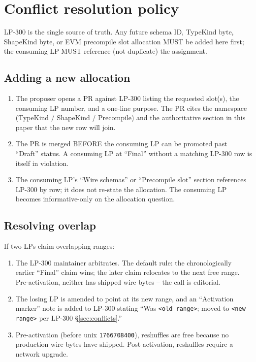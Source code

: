 \section{Conflict resolution policy}
\label{sec:policy}

LP-300 is the single source of truth. Any future schema ID, TypeKind
byte, ShapeKind byte, or EVM precompile slot allocation MUST be added
here first; the consuming LP MUST reference (not duplicate) the
assignment.

\subsection{Adding a new allocation}

\begin{enumerate}[leftmargin=2em,nosep]
\item The proposer opens a PR against LP-300 listing the requested
  slot(s), the consuming LP number, and a one-line purpose. The PR
  cites the namespace (TypeKind / ShapeKind / Precompile) and the
  authoritative section in this paper that the new row will join.
\item The PR is merged BEFORE the consuming LP can be promoted past
  ``Draft'' status. A consuming LP at ``Final'' without a matching
  LP-300 row is itself in violation.
\item The consuming LP's ``Wire schemas'' or ``Precompile slot''
  section references LP-300 by row; it does not re-state the
  allocation. The consuming LP becomes informative-only on the
  allocation question.
\end{enumerate}

\subsection{Resolving overlap}

If two LPs claim overlapping ranges:

\begin{enumerate}[leftmargin=2em,nosep]
\item The LP-300 maintainer arbitrates. The default rule: the
  chronologically earlier ``Final'' claim wins; the later claim
  relocates to the next free range. Pre-activation, neither has
  shipped wire bytes -- the call is editorial.
\item The losing LP is amended to point at its new range, and an
  ``Activation marker'' note is added to LP-300 stating ``Was
  \texttt{<old range>}; moved to \texttt{<new range>} per LP-300
  \S\ref{sec:conflicts}.''
\item Pre-activation (before unix \texttt{1766708400}), reshuffles
  are free because no production wire bytes have shipped.
  Post-activation, reshuffles require a network upgrade.
\end{enumerate}

